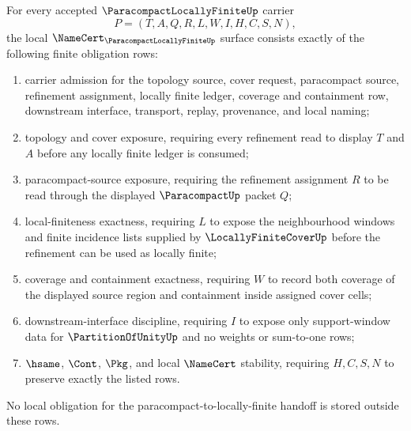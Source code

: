 \begin{theorem}
\label{thm:paracompact-locally-finite-namecert-obligations}
For every accepted $\ParacompactLocallyFiniteUp$ carrier
$$
P=(T,A,Q,R,L,W,I,H,C,S,N),
$$
the local $\NameCert_{\ParacompactLocallyFiniteUp}$ surface consists exactly of the following finite obligation rows:
\begin{enumerate}
\item carrier admission for the topology source, cover request, paracompact source, refinement assignment, locally finite ledger, coverage and containment row, downstream interface, transport, replay, provenance, and local naming;
\item topology and cover exposure, requiring every refinement read to display $T$ and $A$ before any locally finite ledger is consumed;
\item paracompact-source exposure, requiring the refinement assignment $R$ to be read through the displayed $\ParacompactUp$ packet $Q$;
\item local-finiteness exactness, requiring $L$ to expose the neighbourhood windows and finite incidence lists supplied by $\LocallyFiniteCoverUp$ before the refinement can be used as locally finite;
\item coverage and containment exactness, requiring $W$ to record both coverage of the displayed source region and containment inside assigned cover cells;
\item downstream-interface discipline, requiring $I$ to expose only support-window data for $\PartitionOfUnityUp$ and no weights or sum-to-one rows;
\item $\hsame$, $\Cont$, $\Pkg$, and local $\NameCert$ stability, requiring $H,C,S,N$ to preserve exactly the listed rows.
\end{enumerate}
No local obligation for the paracompact-to-locally-finite handoff is stored outside these rows.
\end{theorem}
